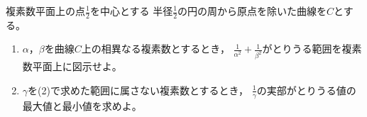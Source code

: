 \documentclass[../../main.tex]{subfiles}
\begin{document}
複素数平面上の点$\displaystyle\frac{1}{2}$を中心とする
半径$\displaystyle\frac{1}{2}$の円の周から原点を除いた曲線を$C$とする。
\begin{enumerate}
  $C$上の複素数$z$に対し，$\displaystyle\frac{1}{z}$の実部は1であることを示せ。
  \item$\alpha$，$\beta$を曲線$C$上の相異なる複素数とするとき，
    $\displaystyle\frac{1}{\alpha^2}+\frac{1}{\beta^2}$がとりうる範囲を複素数平面上に図示せよ。
  \item$\gamma$を(2)で求めた範囲に属さない複素数とするとき，
    $\displaystyle\frac{1}{\gamma}$の実部がとりうる値の最大値と最小値を求めよ。
\end{enumerate}
\end{document}
